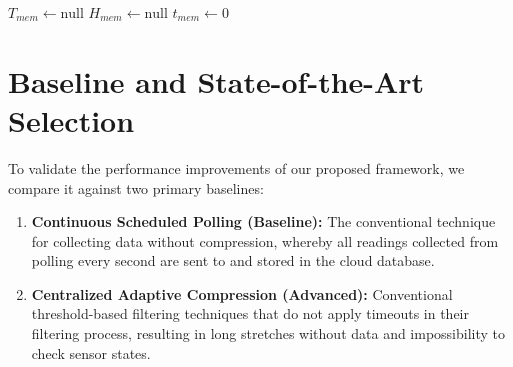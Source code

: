 \begin{algorithm}[htpb]
\SetAlgoLined
{}
 $T_{mem} \leftarrow \text{null}$\;
 $H_{mem} \leftarrow \text{null}$\;
 $t_{mem} \leftarrow 0$\;
 \hrulefill\\
 \caption{Edge-Tier Memorization-Based Data Logging Algorithm}
 \label{alg:memorization_full}
\end{algorithm}

\section{Baseline and State-of-the-Art Selection}
\label{sec:baselines}
To validate the performance improvements of our proposed framework, we compare it against two primary baselines:
\begin{enumerate}
 \item \textbf{Continuous Scheduled Polling (Baseline):} The conventional technique for collecting data without compression, whereby all readings collected from polling every second are sent to and stored in the cloud database.
    \item \textbf{Centralized Adaptive Compression (Advanced):} Conventional threshold-based filtering techniques that do not apply timeouts in their filtering process, resulting in long stretches without data and impossibility to check sensor states.
\end{enumerate}

